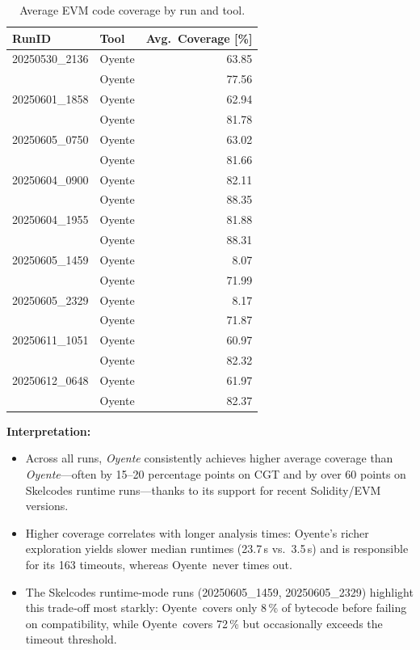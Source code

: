 \documentclass{article}
\newcommand\OY{Oyente}
\newcommand\OYp{\OY\raisebox{0.3ex}{\smaller +}}
\newcommand\CGTrbcA{20250530\_2136}%
\newcommand\CGTrbcB{20250601\_1858}%
\newcommand\CGTrbcC{20250605\_0750}%
\newcommand\CGTsscA{20250604\_0900}%
\newcommand\CGTsscB{20250604\_1955}%
\newcommand\SKCrbcA{20250605\_1459}%
\newcommand\SKCrbcB{20250605\_2329}%
\newcommand\SKCsscA{20250611\_1051}%
\newcommand\SKCsscB{20250612\_0648}%
\begin{document}
	\begin{table}[ht]
		\centering
		\begin{tabular}{llr}
			\toprule
			\textbf{RunID} & \textbf{Tool} & \textbf{Avg.\ Coverage [\%]} \\
			\midrule
			\CGTrbcA & \OY & 63.85 \\
			& \OYp & 77.56 \\
			\CGTrbcB & \OY & 62.94 \\
			& \OYp & 81.78 \\
			\CGTrbcC & \OY & 63.02 \\
			& \OYp & 81.66 \\
			\CGTsscA & \OY & 82.11 \\
			& \OYp & 88.35 \\
			\CGTsscB & \OY & 81.88 \\
			& \OYp & 88.31 \\
			\SKCrbcA & \OY &  8.07 \\
			& \OYp & 71.99 \\
			\SKCrbcB & \OY &  8.17 \\
			& \OYp & 71.87 \\
			\SKCsscA & \OY & 60.97 \\
			& \OYp & 82.32 \\
			\SKCsscB & \OY & 61.97 \\
			& \OYp & 82.37 \\
			\bottomrule
		\end{tabular}
		\caption{Average EVM code coverage by run and tool.}
		\label{tab:coverage_summary}
	\end{table}

	\noindent
	\textbf{Interpretation:}
	\begin{itemize}
		\item Across all runs, \emph{\OYp} consistently achieves higher average coverage than \emph{\OY}—often by 15–20 percentage points on CGT and by over 60 points on Skelcodes runtime runs—thanks to its support for recent Solidity/EVM versions.
		\item Higher coverage correlates with longer analysis times: \OYp’s richer exploration yields slower median runtimes (23.7\,s vs.\ 3.5\,s) and is responsible for its 163 timeouts, whereas \OY\ never times out.
		\item The Skelcodes runtime‐mode runs (\SKCrbcA, \SKCrbcB) highlight this trade‐off most starkly: \OY\ covers only 8\,\% of bytecode before failing on compatibility, while \OYp\ covers 72\,\% but occasionally exceeds the timeout threshold.
	\end{itemize}
\end{document}
